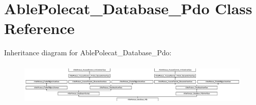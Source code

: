\hypertarget{class_able_polecat___database___pdo}{}\section{Able\+Polecat\+\_\+\+Database\+\_\+\+Pdo Class Reference}
\label{class_able_polecat___database___pdo}
Inheritance diagram for Able\+Polecat\+\_\+\+Database\+\_\+\+Pdo\+:\begin{figure}[H]
\begin{center}
\leavevmode
\includegraphics[height=2.048780cm]{class_able_polecat___database___pdo}
\end{center}
\end{figure}
